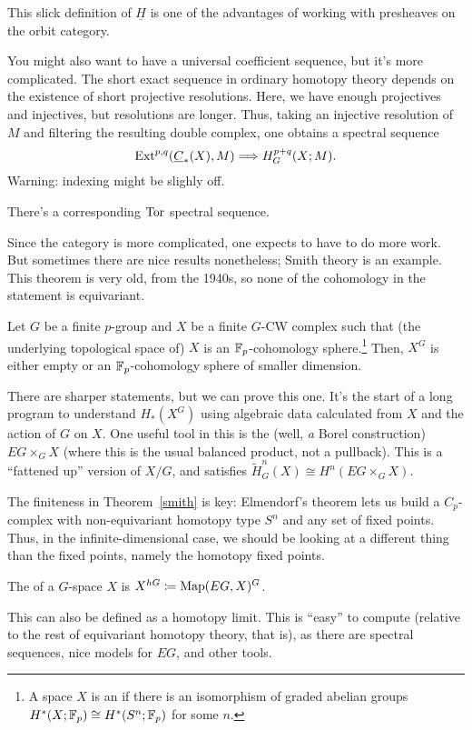 This slick definition of $\underline H$ is one of the advantages of working with presheaves on the orbit category.
\begin{rem}
You might also want to have a universal coefficient sequence, but it's more complicated. The short exact sequence
in ordinary homotopy theory depends on the existence of short projective resolutions. Here, we have enough
projectives and injectives, but resolutions are longer. Thus, taking an injective resolution of $M$ and filtering
the resulting double complex, one obtains a spectral sequence
\[\operatorname{Ext}^{p,q}(\underline C_*(X), M)\Longrightarrow H_G^{p+q}(X;M).\]
{\color{red}Warning}: indexing might be slighly off.

There's a corresponding $\operatorname{Tor}$ spectral sequence.
\end{rem}
Since the category is more complicated, one expects to have to do more work. But sometimes there are nice results
nonetheless; Smith theory is an example. This theorem is very old, from the 1940s, so none of the cohomology in the
statement is equivariant.
\begin{thm}[Smith]
\label{smith}
Let $G$ be a finite $p$-group and $X$ be a finite $G$-CW complex such that (the underlying topological space of)
$X$ is an $\mathbb F_p$-cohomology sphere.\footnote{A space $X$ is an  if there is an
isomorphism of graded abelian groups $H^*(X;\mathbb F_p)\cong H^*(S^n;\mathbb F_p)$ for some $n$.} Then, $X^G$ is either empty or
an $\mathbb F_p$-cohomology sphere of smaller dimension.
\end{thm}
There are sharper statements, but we can prove this one. It's the start of a long program to understand $H_*(X^G)$
using algebraic data calculated from $X$ and the action of $G$ on $X$. One useful tool in this is the  (well, \emph a Borel construction) $EG\times_G X$ (where this is the usual balanced product, not a
pullback). This is a ``fattened up'' version of $X/G$, and satisfies $\widetilde H_G^n(X) \cong H^n(EG\times_G X)$.

The finiteness in Theorem~\ref{smith} is key: Elmendorf's theorem lets us build a $C_p$-complex with
non-equivariant homotopy type $S^n$ and any set of fixed points. Thus, in the infinite-dimensional case, we should
be looking at a different thing than the fixed points, namely the homotopy fixed points.
\begin{defn}
The  of a $G$-space $X$ is $X^{hG}\coloneqq \operatorname{Map}(EG, X)^G$.
\end{defn}
This can also be defined as a homotopy limit. This is ``easy'' to compute (relative to the rest of equivariant
homotopy theory, that is), as there are spectral sequences, nice models for $EG$, and other tools.

